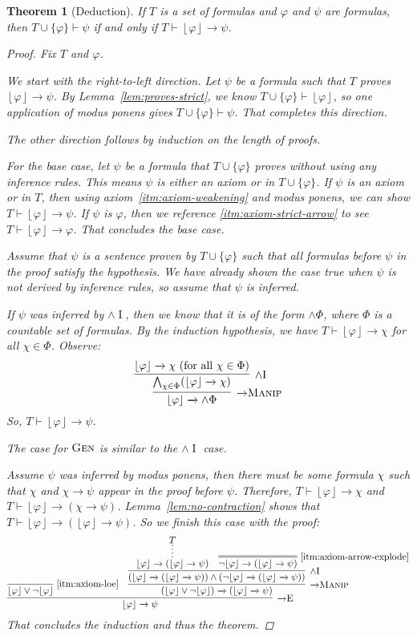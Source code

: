\documentclass{amsart}
\newtheorem{theorem}{Theorem}[section]
\theoremstyle{definition}
\numberwithin{equation}{theorem}
\renewcommand{\phi}{\varphi}
\newcommand{\unwedge}{{\wedge}}
\newcommand{\proves}{\vdash}
\newcommand{\strict}[1]{{\left\lfloor#1\right\rfloor}}
\newcommand{\narrow}[1]{\xrightarrow{#1}}
\renewcommand{\to}{\narrow{}}
\newcommand{\arr}{{\to}}
\newcommand{\intro}{\!\operatorname{I}}
\newcommand{\elim}{\!\operatorname{E}}
\newcommand{\aref}[1]{\!\text{\ref{itm:axiom-#1}}}
\newcommand{\pushdown}{\arr\text{\sc{Manip}}}
\newcommand{\generalization}{\text{\sc{Gen}}}
\begin{document}
\begin{theorem}[Deduction]\label{thm:deduction}
  If $T$ is a set of formulas and $\phi$ and $\psi$ are formulas, then $T\cup\{\phi\}\proves\psi$ if and only if $T\proves\strict\phi\to\psi$.
  \begin{proof}
    Fix $T$ and $\phi$.
  
    We start with the right-to-left direction.
    Let $\psi$ be a formula such that $T$ proves $\strict\phi\to\psi$.
    By Lemma~\ref{lem:proves-strict}, we know $T\cup\{\phi\}\proves\strict\phi$, so one application of modus ponens gives $T\cup\{\phi\}\proves\psi$.
    That completes this direction.
    
    The other direction follows by induction on the length of proofs.
    
    For the base case, let $\psi$ be a formula that $T\cup\{\phi\}$ proves without using any inference rules.
    This means $\psi$ is either an axiom or in $T\cup\{\phi\}$.
    If $\psi$ is an axiom or in $T$, then using axiom~\ref{itm:axiom-weakening} and modus ponens, we can show $T\proves\strict\phi\to\psi$.
    If $\psi$ is $\phi$, then we reference \ref{itm:axiom-strict-arrow} to see $T\proves\strict\phi\to\phi$.
    That concludes the base case.
    
    Assume that $\psi$ is a sentence proven by $T\cup\{\phi\}$ such that all formulas before $\psi$ in the proof satisfy the hypothesis.
    We have already shown the case true when $\psi$ is not derived by inference rules, so assume that $\psi$ is inferred.

    If $\psi$ was inferred by $\unwedge\intro$, then we know that it is of the form $\unwedge\Phi$, where $\Phi$ is a countable set of formulas.
    By the induction hypothesis, we have $T\proves\strict\phi\to\chi$ for all $\chi\in\Phi$.
    Observe:
    \[
      \infer[\pushdown]{\strict\phi\to\unwedge\Phi}{
        \infer[\unwedge\intro]{\bigwedge_{\chi\in\Phi}(\strict\phi\to\chi)}{
          \strict\phi\to\chi\text{ (for all $\chi\in\Phi$)}
        }
      }
    \]
    So, $T\proves\strict\phi\to\psi$.
    
    The case for $\generalization$ is similar to the $\unwedge\intro$ case.
    
    Assume $\psi$ was inferred by modus ponens, then there must be some formula $\chi$ such that $\chi$ and $\chi\to\psi$ appear in the proof before $\psi$.
    Therefore, $T\proves\strict\phi\to\chi$ and $T\proves\strict\phi\to(\chi\to\psi)$.
    Lemma~\ref{lem:no-contraction} shows that $T\proves\strict\phi\to(\strict\phi\to\psi)$.
    So we finish this case with the proof:
    \[
      \infer[\arr\elim]{\strict\phi\to\psi}{
        \infer[\aref{loe}]{\strict\phi\vee\neg\strict\phi}{} &
        \infer[\pushdown]{(\strict\phi\vee\neg\strict\phi)\to(\strict\phi\to\psi)}{
          \infer[\unwedge\intro]{(\strict\phi\to(\strict\phi\to\psi))\wedge(\neg\strict\phi\to(\strict\phi\to\psi))}{
            \infer*{\strict\phi\to(\strict\phi\to\psi)}{T} &
            \infer=[\aref{arrow-explode}]{\neg\strict\phi\to(\strict\phi\to\psi)}{}
          }
        }
      }
    \]
    That concludes the induction and thus the theorem.
  \end{proof}
\end{theorem}
\end{document}
